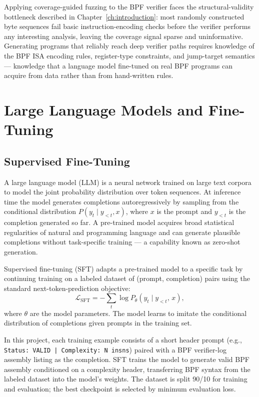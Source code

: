 Applying coverage-guided fuzzing to the BPF verifier faces the structural-validity
bottleneck described in Chapter~\ref{ch:introduction}: most randomly constructed
byte sequences fail basic instruction-encoding checks before the verifier performs
any interesting analysis, leaving the coverage signal sparse and uninformative.
Generating programs that reliably reach deep verifier paths requires knowledge of
the BPF ISA encoding rules, register-type constraints, and jump-target semantics
--- knowledge that a language model fine-tuned on real BPF programs can acquire
from data rather than from hand-written rules.

\section{Large Language Models and Fine-Tuning}
\label{sec:llm}

\subsection{Supervised Fine-Tuning}
\label{sec:sft}

A large language model (LLM) is a neural network trained on large text corpora to
model the joint probability distribution over token sequences.
At inference time the model generates completions autoregressively by sampling
from the conditional distribution $P(y_t \mid y_{<t}, x)$, where $x$ is the
prompt and $y_{<t}$ is the completion generated so far.
A pre-trained model acquires broad statistical regularities of natural and
programming language and can generate plausible completions without task-specific
training --- a capability known as zero-shot generation.

Supervised fine-tuning (SFT) adapts a pre-trained model to a specific task by
continuing training on a labeled dataset of (prompt, completion) pairs using the
standard next-token-prediction objective:
\begin{equation}
  \mathcal{L}_{\mathrm{SFT}}
    = -\sum_{t} \log P_\theta\!\left(y_t \mid y_{<t},\, x\right),
\end{equation}
where $\theta$ are the model parameters.
The model learns to imitate the conditional distribution of completions given
prompts in the training set.

In this project, each training example consists of a short header prompt
(e.g., \texttt{Status: VALID | Complexity: N insns}) paired with a BPF
verifier-log assembly listing as the completion.
SFT trains the model to generate valid BPF assembly conditioned on a complexity
header, transferring BPF syntax from the labeled dataset into the model's
weights.
The dataset is split 90/10 for training and evaluation; the best checkpoint is
selected by minimum evaluation loss.

